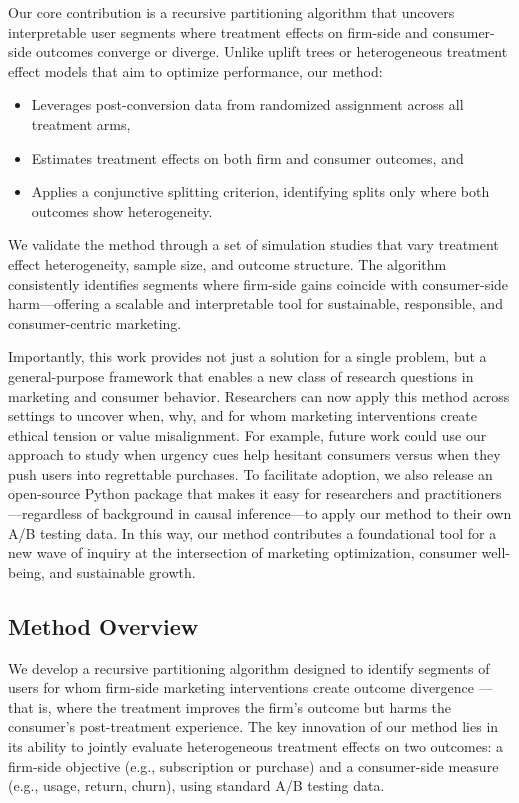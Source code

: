 \documentclass[11pt,letterpaper,english]{article}
\theoremstyle{definition}
\theoremstyle{definition}
\begin{document}
\begin{bibunit}
Our core contribution is a recursive partitioning algorithm that uncovers interpretable user segments where treatment effects on firm-side and consumer-side outcomes converge or diverge. Unlike uplift trees or heterogeneous treatment effect models that aim to optimize performance, our method:
\begin{itemize}
    \item Leverages post-conversion data from randomized assignment across all treatment arms,
    \item Estimates treatment effects on both firm and consumer outcomes, and
    \item Applies a conjunctive splitting criterion, identifying splits only where both outcomes show heterogeneity.
\end{itemize}
We validate the method through a set of simulation studies that vary treatment effect heterogeneity, sample size, and outcome structure. The algorithm consistently identifies segments where firm-side gains coincide with consumer-side harm—offering a scalable and interpretable tool for sustainable, responsible, and consumer-centric marketing.

Importantly, this work provides not just a solution for a single problem, but a general-purpose framework that enables a new class of research questions in marketing and consumer behavior. Researchers can now apply this method across settings to uncover when, why, and for whom marketing interventions create ethical tension or value misalignment. For example, future work could use our approach to study when urgency cues help hesitant consumers versus when they push users into regrettable purchases. To facilitate adoption, we also release an open-source Python package that makes it easy for researchers and practitioners—regardless of background in causal inference—to apply our method to their own A/B testing data. In this way, our method contributes a foundational tool for a new wave of inquiry at the intersection of marketing optimization, consumer well-being, and sustainable growth.

\subsection{Method Overview}
We develop a recursive partitioning algorithm designed to identify segments of users for whom firm-side marketing interventions create outcome divergence — that is, where the treatment improves the firm's outcome but harms the consumer's post-treatment experience. The key innovation of our method lies in its ability to jointly evaluate heterogeneous treatment effects on two outcomes: a firm-side objective (e.g., subscription or purchase) and a consumer-side measure (e.g., usage, return, churn), using standard A/B testing data.


\end{bibunit}
\end{document}
